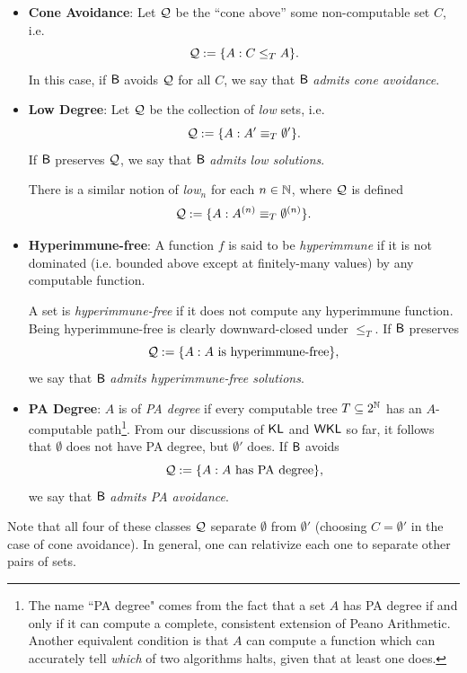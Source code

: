 \documentclass{amsart}
\begin{document}
	\begin{itemize}
		\item \textbf{Cone Avoidance}: Let $\mathcal{Q}$ be the ``cone above'' some non-computable set $C$, i.e.
		$$
		\mathcal{Q} := \{A:  C\leq_T A\}.
		$$
		In this case, if $\sf{B}$ avoids $\mathcal{Q}$ for all $C$, we say that $\sf{B}$ \textit{admits cone avoidance}. \\
		
		\item \textbf{Low Degree}: Let $\mathcal{Q}$ be the collection of \textit{low} sets, i.e.
		$$
		\mathcal{Q} := \{A: A'\equiv_T \emptyset'\}.
		$$
		If $\sf{B}$ preserves $\mathcal{Q}$, we say that $\sf{B}$ \textit{admits low solutions}.
		
		\noindent There is a similar notion of \textit{low}$_n$ for each $n\in\mathbb{N}$, where $\mathcal{Q}$ is defined
		$$
		\mathcal{Q} := \{A: A^{(n)}\equiv_T \emptyset^{(n)}\}.
		$$
		\item \textbf{Hyperimmune-free}: A function $f$ is said to be \textit{hyperimmune} if it is not dominated (i.e. bounded above except at finitely-many values) by any computable function. 
		
		A set is \textit{hyperimmune-free} if it does not compute any hyperimmune function. Being hyperimmune-free is clearly downward-closed under $\leq_T$. If $\sf{B}$ preserves
		$$
		\mathcal{Q} := \{A: A\text{ is hyperimmune-free}\},
		$$
		we say that $\sf{B}$ \textit{admits hyperimmune-free solutions}.\\
		
		\item \textbf{PA Degree}: $A$ is of \textit{PA degree} if every computable tree $T\subseteq 2^{\mathbb{N}}$ has an $A$-computable path\footnote{The name ``PA degree" comes from the fact that a set $A$ has PA degree if and only if it can compute a complete, consistent extension of Peano Arithmetic. Another equivalent condition is that $A$ can compute a function which can accurately tell \textit{which} of two algorithms halts, given that at least one does.}. From our discussions of $\operatorname{\sf{KL}}$ and $\sf{WKL}$ so far, it follows that $\emptyset$ does not have PA degree, but $\emptyset'$ does. If $\sf{B}$ avoids
		$$
		\mathcal{Q} := \{A: A \text{ has PA degree}\},
		$$
		we say that $\sf{B}$ \textit{admits PA avoidance}. 
	\end{itemize}
	
	Note that all four of these classes $\mathcal{Q}$ separate $\emptyset$ from $\emptyset'$ (choosing $C=\emptyset'$ in the case of cone avoidance). In general, one can relativize each one to separate other pairs of sets.
	
\end{document}
